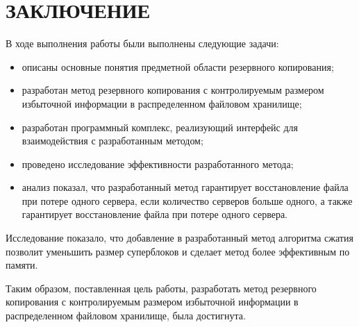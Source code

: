 \chapter*{ЗАКЛЮЧЕНИЕ}

\begin{flushleft}
В ходе выполнения работы были выполнены следующие задачи:
\end{flushleft}
\begin{itemize}
\item описаны основные понятия предметной области резервного копирования;
\item разработан метод резервного копирования с контролируемым размером избыточной информации в распределенном файловом хранилище;
\item разработан программный комплекс, реализующий интерфейс для взаимодействия с разработанным методом;
\item проведено исследование эффективности разработанного метода;
\item анализ показал, что разработанный метод гарантирует восстановление файла при потере одного сервера, если количество серверов больше одного, а также гарантирует восстановление файла при потере одного сервера.   
\end{itemize}

Исследование показало, что добавление в разработанный метод алгоритма сжатия позволит уменьшить размер суперблоков и сделает метод более эффективным по памяти.  

Таким образом, поставленная цель работы, разработать метод резервного копирования с контролируемым размером избыточной информации в распределенном файловом хранилище, была достигнута.
